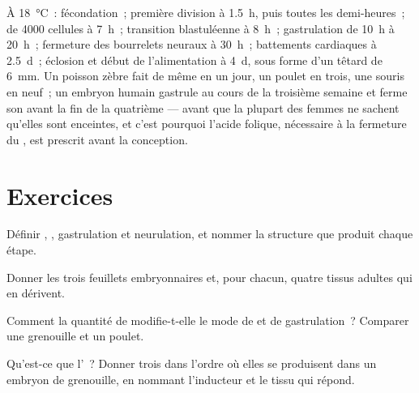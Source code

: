 \begin{example}\label{ex:b2:vertebrate-development:timetable}
À \qty{18}{\celsius}~: fécondation~; première division à \qty{1.5}{h},
puis toutes les demi-heures~;  de \num{4000} cellules à
\qty{7}{h}~; transition blastuléenne à \qty{8}{h}~; gastrulation de
\qty{10}{h} à \qty{20}{h}~; fermeture des bourrelets neuraux à
\qty{30}{h}~; battements cardiaques à \qty{2.5}{d}~; éclosion et début
de l'alimentation à \qty{4}{d}, sous forme d'un têtard de \qty{6}{mm}.
Un poisson zèbre fait de même en un jour, un poulet en trois, une
souris en neuf~; un embryon humain gastrule au cours de la troisième
semaine et ferme son  avant la fin de la quatrième --- avant
que la plupart des femmes ne sachent qu'elles sont enceintes, et c'est
pourquoi l'acide folique, nécessaire à la fermeture du , est
prescrit avant la conception.
\end{example}

\section{Exercices}

\begin{exercise}[$\star$]\label{exo:b2:vertebrate-development:1}
Définir , , gastrulation et neurulation, et nommer
la structure que produit chaque étape.
\end{exercise}

\begin{exercise}[$\star$]\label{exo:b2:vertebrate-development:2}
Donner les trois feuillets embryonnaires et, pour chacun, quatre tissus
adultes qui en dérivent.
\end{exercise}

\begin{exercise}[$\star$]\label{exo:b2:vertebrate-development:3}
Comment la quantité de  modifie-t-elle le mode de 
et de gastrulation~? Comparer une grenouille et un poulet.
\end{exercise}

\begin{exercise}[$\star$]\label{exo:b2:vertebrate-development:4}
Qu'est-ce que l'~? Donner trois  dans l'ordre où elles
se produisent dans un embryon de grenouille, en nommant l'inducteur et
le tissu qui répond.
\end{exercise}

